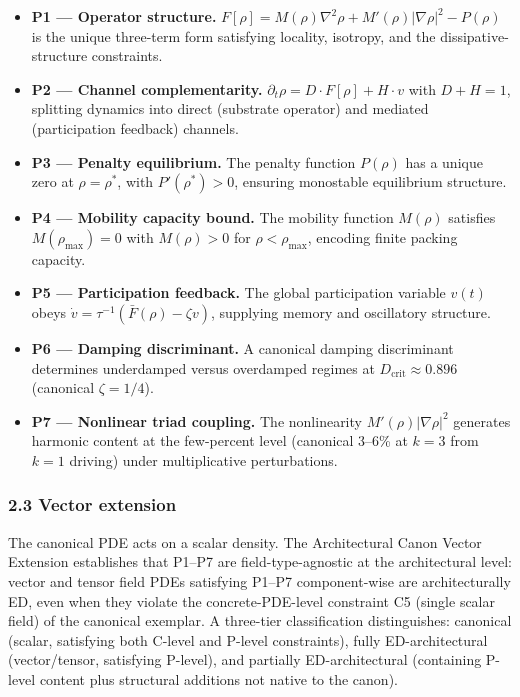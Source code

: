 \documentclass[
  11pt,a4paper]{article}
\providecommand{\tightlist}{%
  \setlength{\itemsep}{0pt}\setlength{\parskip}{0pt}}
\begin{document}
\begin{itemize}
\tightlist
\item
  \textbf{P1 --- Operator structure.}
  \(F[\rho] = M(\rho)\nabla^2\rho + M'(\rho)|\nabla\rho|^2 - P(\rho)\)
  is the unique three-term form satisfying locality, isotropy, and the
  dissipative-structure constraints.
\item
  \textbf{P2 --- Channel complementarity.}
  \(\partial_t\rho = D \cdot F[\rho] + H \cdot v\) with \(D + H = 1\),
  splitting dynamics into direct (substrate operator) and mediated
  (participation feedback) channels.
\item
  \textbf{P3 --- Penalty equilibrium.} The penalty function \(P(\rho)\)
  has a unique zero at \(\rho = \rho^*\), with \(P'(\rho^*) > 0\),
  ensuring monostable equilibrium structure.
\item
  \textbf{P4 --- Mobility capacity bound.} The mobility function
  \(M(\rho)\) satisfies \(M(\rho_\mathrm{max}) = 0\) with
  \(M(\rho) > 0\) for \(\rho < \rho_\mathrm{max}\), encoding finite
  packing capacity.
\item
  \textbf{P5 --- Participation feedback.} The global participation
  variable \(v(t)\) obeys
  \(\dot v = \tau^{-1}(\bar F(\rho) - \zeta v)\), supplying memory and
  oscillatory structure.
\item
  \textbf{P6 --- Damping discriminant.} A canonical damping discriminant
  determines underdamped versus overdamped regimes at
  \(D_\mathrm{crit} \approx 0.896\) (canonical \(\zeta = 1/4\)).
\item
  \textbf{P7 --- Nonlinear triad coupling.} The nonlinearity
  \(M'(\rho)|\nabla\rho|^2\) generates harmonic content at the
  few-percent level (canonical 3--6\% at \(k = 3\) from \(k = 1\)
  driving) under multiplicative perturbations.
\end{itemize}

\subsubsection{2.3 Vector extension}\label{vector-extension}

The canonical PDE acts on a scalar density. The Architectural Canon
Vector Extension establishes that P1--P7 are field-type-agnostic at the
architectural level: vector and tensor field PDEs satisfying P1--P7
component-wise are architecturally ED, even when they violate the
concrete-PDE-level constraint C5 (single scalar field) of the canonical
exemplar. A three-tier classification distinguishes: canonical (scalar,
satisfying both C-level and P-level constraints), fully ED-architectural
(vector/tensor, satisfying P-level), and partially ED-architectural
(containing P-level content plus structural additions not native to the
canon).
\end{document}
